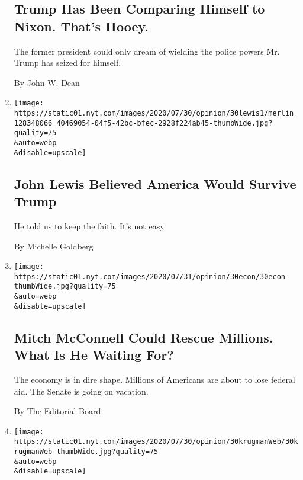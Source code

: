 \begin{enumerate}
  \hypertarget{trump-has-been-comparing-himself-to-nixon-thats-hooey}{%
  \subsection{Trump Has Been Comparing Himself to Nixon. That's
  Hooey.}\label{trump-has-been-comparing-himself-to-nixon-thats-hooey}}

  The former president could only dream of wielding the police powers
  Mr. Trump has seized for himself.

  By John W. Dean
\item
  \href{/2020/07/30/opinion/john-lewis-legacy.html}{}

  \texttt{[image: https://static01.nyt.com/images/2020/07/30/opinion/30lewis1/merlin\_128348066\_40469054-04f5-42bc-bfec-2928f224ab45-thumbWide.jpg?quality=75\\\&auto=webp\\\&disable=upscale]}

  \hypertarget{john-lewis-believed-america-would-survive-trump}{%
  \subsection{John Lewis Believed America Would Survive
  Trump}\label{john-lewis-believed-america-would-survive-trump}}

  He told us to keep the faith. It's not easy.

  By Michelle Goldberg
\item
  \href{/2020/07/30/opinion/mitch-mcconnell-coronavirus-economy.html}{}

  \texttt{[image: https://static01.nyt.com/images/2020/07/31/opinion/30econ/30econ-thumbWide.jpg?quality=75\\\&auto=webp\\\&disable=upscale]}

  \hypertarget{mitch-mcconnell-could-rescue-millions-what-is-he-waiting-for}{%
  \subsection{Mitch McConnell Could Rescue Millions. What Is He Waiting
  For?}\label{mitch-mcconnell-could-rescue-millions-what-is-he-waiting-for}}

  The economy is in dire shape. Millions of Americans are about to lose
  federal aid. The Senate is going on vacation.

  By The Editorial Board
\item
  \href{/2020/07/30/opinion/trump-coronavirus-economy.html}{}

  \texttt{[image: https://static01.nyt.com/images/2020/07/30/opinion/30krugmanWeb/30krugmanWeb-thumbWide.jpg?quality=75\\\&auto=webp\\\&disable=upscale]}


\end{enumerate}
